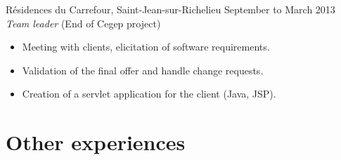 \documentclass{res}
\newcommand{\inFrench}[1]{}
\newcommand{\inEnglish}[1]{#1}
\begin{document}
\begin{resume}
{	%

	Résidences du Carrefour, Saint-Jean-sur-Richelieu
	\hfill September to March 2013 \\
	{\sl Team leader} \hfill (End of Cegep project)
	\vspace{0.05in}

	\begin{itemize} \itemsep -2pt
		\item Meeting with clients, elicitation of software requirements.
		\item Validation of the final offer and handle change requests.
		\item Creation of a servlet application for the client (Java, JSP).
	\end{itemize}
}

\inFrench{
	\section{Expériences connexes}
}
\inEnglish{
	\section{Other experiences}
}
\vspace{6pt}

\inFrench{
	{\sl Chef d'équipe, secteur restauration}
		\hfill mai à août 2011, 2012 et 2013 \\
	Parc d'attractions La Ronde

	\vspace{0.05in}
	\begin{itemize} \itemsep -2pt
		\item Gestion et formation continue de 8 à 12 personnes;
		\item Gestion des inventaires, des commandes et du fonctionnement de quatre points de vente;
		\item Responsable d’une partie de la communication entre les superviseurs et les préposés;
		\item Formation des nouveaux employés.
	\end{itemize}


}
\end{resume}
\end{document}
